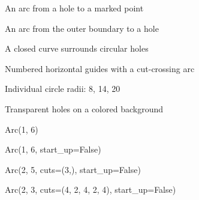\documentclass{article}
\begin{document}
\clearpage
\begin{center}
\Large An arc from a hole to a marked point\par\bigskip
{}
\end{center}
\clearpage
\begin{center}
\Large An arc from the outer boundary to a hole\par\bigskip
{}
\end{center}
\clearpage
\begin{center}
\Large A closed curve surrounds circular holes\par\bigskip
{}
\end{center}
\clearpage
\begin{center}
\Large Numbered horizontal guides with a cut-crossing arc\par\bigskip
{}
\end{center}
\clearpage
\begin{center}
\Large Individual circle radii: 8, 14, 20\par\bigskip
{}
\end{center}
\clearpage
\begin{center}
\Large Transparent holes on a colored background\par\bigskip
{}
\end{center}
\clearpage
\begin{center}
\Large Arc(1, 6)\par\bigskip
{}
\end{center}
\clearpage
\begin{center}
\Large Arc(1, 6, start\_up=False)\par\bigskip
{}
\end{center}
\clearpage
\begin{center}
\Large Arc(2, 5, cuts=(3,), start\_up=False)\par\bigskip
{}
\end{center}
\clearpage
\begin{center}
\Large Arc(2, 3, cuts=(4, 2, 4, 2, 4), start\_up=False)\par\bigskip
{}
\end{center}
\end{document}
